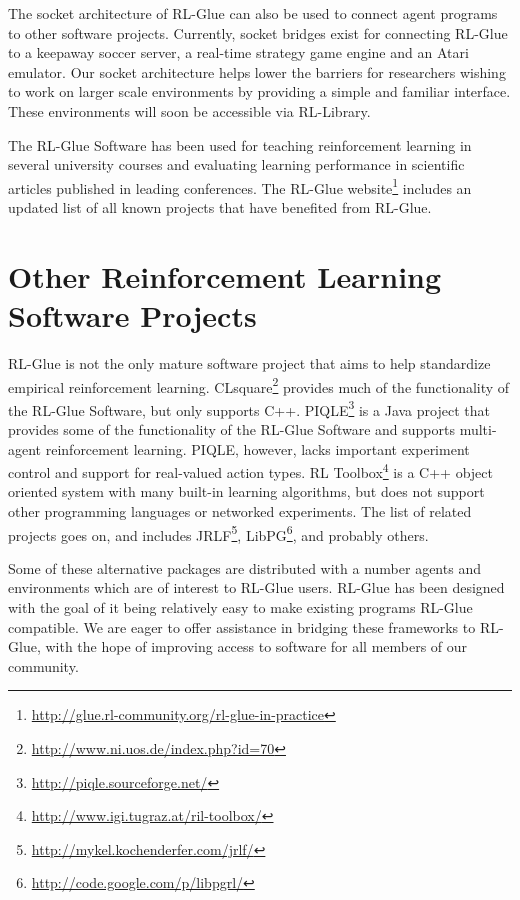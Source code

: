 \documentclass[twopage,11pt]{article}
\begin{document}
The socket architecture of RL-Glue can also be used to connect agent programs to other software projects. Currently, socket bridges exist for connecting RL-Glue to a keepaway soccer server, a real-time strategy game engine and an Atari emulator. Our socket architecture helps lower the barriers for researchers wishing to work on larger scale environments by providing a simple and familiar interface. These environments will soon be accessible via RL-Library. 

The RL-Glue Software has been used for teaching reinforcement learning in several university courses and evaluating learning performance in scientific articles published in leading conferences. The RL-Glue website\footnote{\url{http://glue.rl-community.org/rl-glue-in-practice}} includes an updated list of all known projects that have benefited from RL-Glue.



\section{Other Reinforcement Learning Software Projects}
RL-Glue is not the only mature software project that aims to help standardize empirical reinforcement learning. CLsquare\footnote{\url{http://www.ni.uos.de/index.php?id=70}} provides much of the functionality of the RL-Glue Software, but only supports C++.
PIQLE\footnote{\url{http://piqle.sourceforge.net/}} is a Java project that provides some of the functionality of the RL-Glue Software and supports multi-agent reinforcement learning. PIQLE, however, lacks important experiment control and support for real-valued action types. RL Toolbox\footnote{\url{http://www.igi.tugraz.at/ril-toolbox/}
} is a C++ object oriented system with many built-in learning algorithms, but does not support other programming languages or networked experiments.  The list of related projects goes on, and includes JRLF\footnote{\url{http://mykel.kochenderfer.com/jrlf/}}, LibPG\footnote{\url{http://code.google.com/p/libpgrl/}}, and probably others.

Some of these alternative packages are distributed with a number agents and environments which are of interest to RL-Glue users. RL-Glue has been designed with the goal of it being relatively easy to make existing programs RL-Glue compatible.  We are eager to offer assistance in bridging these frameworks to RL-Glue, with the hope of improving access to software for all members of our community.
\end{document}
